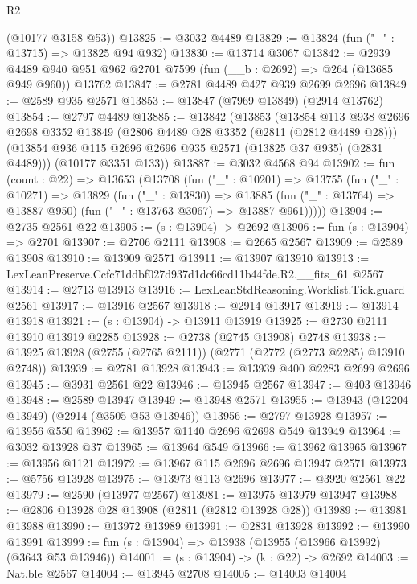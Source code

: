 \begin{lexlean}{R2}
\begin{coremodule}
      (@10177 @3158 @53))
@13825 := @3032 @4489
@13829 := @13824 (fun ("_" : @13715) => @13825 @94 @932)
@13830 := @13714 @3067
@13842 := @2939
    @4489
    @940
    @951
    @962
    @2701
    @7599
    (fun (__b : @2692) => @264 (@13685 @949 @960))
    @13762
@13847 := @2781 @4489 @427 @939 @2699 @2696
@13849 := @2589 @935 @2571
@13853 := @13847 (@7969 @13849) (@2914 @13762)
@13854 := @2797 @4489
@13885 := @13842
    (@13853
      (@13854
        @113
        @938
        @2696
        @2698
        @3352
        @13849
        (@2806 @4489 @28 @3352 (@2811 (@2812 @4489 @28)))
        (@13854 @936 @115 @2696 @2696 @935 @2571 (@13825 @37 @935) (@2831 @4489)))
      (@10177 @3351 @133))
@13887 := @3032 @4568 @94
@13902 := fun (count : @22) =>
  @13653
    (@13708
      (fun ("_" : @10201) =>
      @13755
        (fun ("_" : @10271) =>
        @13829
          (fun ("_" : @13830) =>
          @13885 (fun ("_" : @13764) => @13887 @950) (fun ("_" : @13763 @3067) => @13887 @961)))))
@13904 := @2735 @2561 @22
@13905 := (s : @13904) -> @2692
@13906 := fun (s : @13904) => @2701
@13907 := @2706 @2111
@13908 := @2665 @2567
@13909 := @2589 @13908
@13910 := @13909 @2571
@13911 := @13907 @13910
@13913 := LexLeanPreserve.Ccfc71ddbf027d937d1dc66cd11b44fde.R2.__fits_61 @2567
@13914 := @2713 @13913
@13916 := LexLeanStdReasoning.Worklist.Tick.guard @2561
@13917 := @13916 @2567
@13918 := @2914 @13917
@13919 := @13914 @13918
@13921 := (s : @13904) -> @13911 @13919
@13925 := @2730 @2111 @13910 @13919 @2285
@13928 := @2738 (@2745 @13908) @2748
@13938 := @13925 @13928 (@2755 (@2765 @2111)) (@2771 (@2772 (@2773 @2285) @13910 @2748))
@13939 := @2781 @13928
@13943 := @13939 @400 @2283 @2699 @2696
@13945 := @3931 @2561 @22
@13946 := @13945 @2567
@13947 := @403 @13946
@13948 := @2589 @13947
@13949 := @13948 @2571
@13955 := @13943 (@12204 @13949) (@2914 (@3505 @53 @13946))
@13956 := @2797 @13928
@13957 := @13956 @550
@13962 := @13957 @1140 @2696 @2698 @549 @13949
@13964 := @3032 @13928 @37
@13965 := @13964 @549
@13966 := @13962 @13965
@13967 := @13956 @1121
@13972 := @13967 @115 @2696 @2696 @13947 @2571
@13973 := @5756 @13928
@13975 := @13973 @113 @2696
@13977 := @3920 @2561 @22
@13979 := @2590 (@13977 @2567)
@13981 := @13975 @13979 @13947
@13988 := @2806 @13928 @28 @13908 (@2811 (@2812 @13928 @28))
@13989 := @13981 @13988
@13990 := @13972 @13989
@13991 := @2831 @13928
@13992 := @13990 @13991
@13999 := fun (s : @13904) => @13938 (@13955 (@13966 @13992) (@3643 @53 @13946))
@14001 := (s : @13904) -> (k : @22) -> @2692
@14003 := Nat.ble @2567
@14004 := @13945 @2708
@14005 := @14003 @14004

\end{coremodule}
\end{lexlean}
